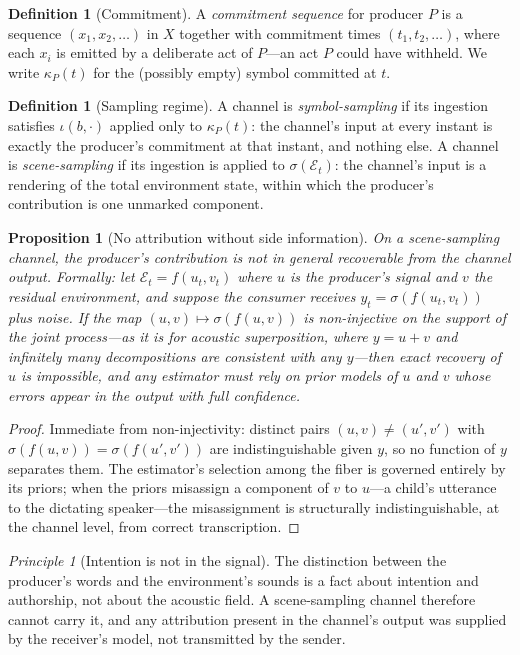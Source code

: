 \documentclass[11pt,oneside]{book}
\theoremstyle{plain}
\newtheorem{proposition}[theorem]{Proposition}
\theoremstyle{definition}
\newtheorem{definition}[theorem]{Definition}
\theoremstyle{remark}
\newtheorem{principle}[theorem]{Principle}
\newcommand{\Env}{\mathcal{E}}
\newcommand{\commit}{\kappa}
\newcommand{\scene}{\sigma}
\begin{document}
\begin{definition}[Commitment]
A \emph{commitment sequence} for producer $P$ is a sequence $(x_1, x_2, \ldots)$ in $X$ together with commitment times $(t_1, t_2, \ldots)$, where each $x_i$ is emitted by a deliberate act of $P$---an act $P$ could have withheld. We write $\commit_P(t)$ for the (possibly empty) symbol committed at $t$.
\end{definition}

\begin{definition}[Sampling regime]
A channel is \emph{symbol-sampling} if its ingestion satisfies $\iota(b, \cdot)$ applied only to $\commit_P(t)$: the channel's input at every instant is exactly the producer's commitment at that instant, and nothing else. A channel is \emph{scene-sampling} if its ingestion is applied to $\scene(\Env_t)$: the channel's input is a rendering of the total environment state, within which the producer's contribution is one unmarked component.
\end{definition}

\begin{proposition}[No attribution without side information]
On a scene-sampling channel, the producer's contribution is not in general recoverable from the channel output. Formally: let $\Env_t = f(u_t, v_t)$ where $u$ is the producer's signal and $v$ the residual environment, and suppose the consumer receives $y_t = \scene(f(u_t, v_t))$ plus noise. If the map $(u, v) \mapsto \scene(f(u,v))$ is non-injective on the support of the joint process---as it is for acoustic superposition, where $y = u + v$ and infinitely many decompositions are consistent with any $y$---then exact recovery of $u$ is impossible, and any estimator must rely on prior models of $u$ and $v$ whose errors appear in the output with full confidence.
\end{proposition}

\begin{proof}
Immediate from non-injectivity: distinct pairs $(u,v) \neq (u',v')$ with $\scene(f(u,v)) = \scene(f(u',v'))$ are indistinguishable given $y$, so no function of $y$ separates them. The estimator's selection among the fiber is governed entirely by its priors; when the priors misassign a component of $v$ to $u$---a child's utterance to the dictating speaker---the misassignment is structurally indistinguishable, at the channel level, from correct transcription.
\end{proof}

\begin{principle}[Intention is not in the signal]
The distinction between the producer's words and the environment's sounds is a fact about intention and authorship, not about the acoustic field. A scene-sampling channel therefore cannot carry it, and any attribution present in the channel's output was supplied by the receiver's model, not transmitted by the sender.
\end{principle}
\end{document}
